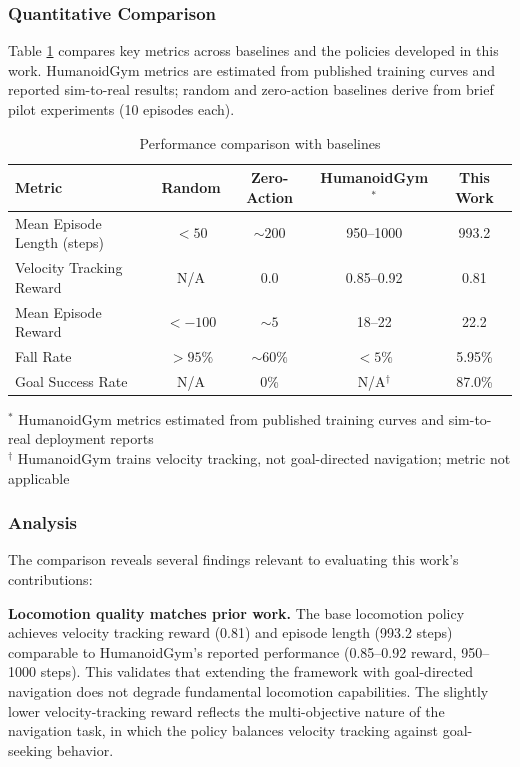 \documentclass[12pt,a4paper]{article}
\begin{document}
\subsubsection{Quantitative Comparison}

Table \ref{tab:baseline_comparison} compares key metrics across baselines and the policies developed in this work. HumanoidGym metrics are estimated from published training curves and reported sim-to-real results; random and zero-action baselines derive from brief pilot experiments (10 episodes each).

\begin{table}[H]
\centering
\caption{Performance comparison with baselines}
\label{tab:baseline_comparison}
\footnotesize
\begin{tabular}{l|c|c|c|c}
\toprule
\textbf{Metric} & \textbf{Random} & \textbf{Zero-Action} & \textbf{HumanoidGym}$^*$ & \textbf{This Work} \\
\midrule
Mean Episode Length (steps) & $< 50$ & $\sim 200$ & 950--1000 & 993.2 \\
Velocity Tracking Reward & N/A & 0.0 & 0.85--0.92 & 0.81 \\
Mean Episode Reward & $< -100$ & $\sim 5$ & 18--22 & 22.2 \\
Fall Rate & $> 95\%$ & $\sim 60\%$ & $< 5\%$ & 5.95\% \\
Goal Success Rate & N/A & 0\% & N/A$^\dagger$ & 87.0\% \\
\bottomrule
\end{tabular}
\begin{flushleft}
\scriptsize
$^*$ HumanoidGym metrics estimated from published training curves and sim-to-real deployment reports \\
$^\dagger$ HumanoidGym trains velocity tracking, not goal-directed navigation; metric not applicable
\end{flushleft}
\end{table}

\subsubsection{Analysis}

The comparison reveals several findings relevant to evaluating this work's contributions:

\textbf{Locomotion quality matches prior work.} The base locomotion policy achieves velocity tracking reward (0.81) and episode length (993.2 steps) comparable to HumanoidGym's reported performance (0.85--0.92 reward, 950--1000 steps). This validates that extending the framework with goal-directed navigation does not degrade fundamental locomotion capabilities. The slightly lower velocity-tracking reward reflects the multi-objective nature of the navigation task, in which the policy balances velocity tracking against goal-seeking behavior.
\end{document}
